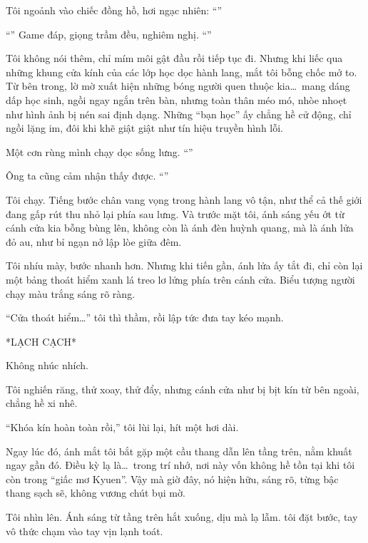 \documentclass[../main.tex]{subfiles}
\begin{document}
Tôi ngoảnh vào chiếc đồng hồ, hơi ngạc nhiên: ``''

``'' Game đáp, giọng trầm đều, nghiêm nghị. ``''

Tôi không nói thêm, chỉ mím môi gật đầu rồi tiếp tục đi. Nhưng khi liếc qua những khung cửa kính của các lớp học dọc hành lang, mắt tôi bỗng chốc mở to. Từ bên trong, lờ mờ xuất hiện những bóng người quen thuộc kia\dots\ mang dáng dấp học sinh, ngồi ngay ngắn trên bàn, nhưng toàn thân méo mó, nhòe nhoẹt như hình ảnh bị nén sai định dạng. Những ``bạn học'' ấy chẳng hề cử động, chỉ ngồi lặng im, đôi khi khẽ giật giật như tín hiệu truyền hình lỗi.

Một cơn rùng mình chạy dọc sống lưng. ``''

Ông ta cũng cảm nhận thấy được. ``''

Tôi chạy. Tiếng bước chân vang vọng trong hành lang vô tận, như thể cả thế giới đang gấp rút thu nhỏ lại phía sau lưng. Và trước mặt tôi, ánh sáng yếu ớt từ cánh cửa kia bỗng bùng lên, không còn là ánh đèn huỳnh quang, mà là ánh lửa đỏ au, như bỉ ngạn nở lập lòe giữa đêm.

Tôi nhíu mày, bước nhanh hơn. Nhưng khi tiến gần, ánh lửa ấy tắt đi, chỉ còn lại một bảng thoát hiểm xanh lá treo lơ lửng phía trên cánh cửa. Biểu tượng người chạy màu trắng sáng rõ ràng.

``Cửa thoát hiểm\dots'' tôi thì thầm, rồi lập tức đưa tay kéo mạnh.

*LẠCH CẠCH*

Không nhúc nhích.

Tôi nghiến răng, thử xoay, thử đẩy, nhưng cánh cửa như bị bịt kín từ bên ngoài, chẳng hề xi nhê.

``Khóa kín hoàn toàn rồi,'' tôi lùi lại, hít một hơi dài.

Ngay lúc đó, ánh mắt tôi bắt gặp một cầu thang dẫn lên tầng trên, nằm khuất ngay gần đó. Điều kỳ lạ là\dots\ trong trí nhớ, nơi này vốn không hề tồn tại khi tôi còn trong ``giấc mơ Kyuen''. Vậy mà giờ đây, nó hiện hữu, sáng rõ, từng bậc thang sạch sẽ, không vương chút bụi mờ.

Tôi nhìn lên. Ánh sáng từ tầng trên hắt xuống, dịu mà lạ lẫm. tôi đặt bước, tay vô thức chạm vào tay vịn lạnh toát.
\end{document}
